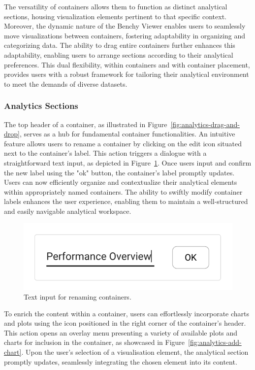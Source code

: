 The versatility of containers allows them to function as distinct analytical sections, housing visualization elements pertinent to that specific context. Moreover, the dynamic nature of the Benchy Viewer enables users to seamlessly move visualizations between containers, fostering adaptability in organizing and categorizing data. The ability to drag entire containers further enhances this adaptability, enabling users to arrange sections according to their analytical preferences. This dual flexibility, within containers and with container placement, provides users with a robust framework for tailoring their analytical environment to meet the demands of diverse datasets.

\subsubsection{Analytics Sections}

The top header of a container, as illustrated in Figure~\ref{fig:analytics-drag-and-drop}, serves as a hub for fundamental container functionalities. An intuitive feature allows users to rename a container by clicking on the edit icon situated next to the container's label. This action triggers a dialogue with a straightforward text input, as depicted in Figure~\ref{fig:analytics-section-rename}. Once users input and confirm the new label using the "ok" button, the container's label promptly updates.\\
Users can now efficiently organize and contextualize their analytical elements within appropriately named containers. The ability to swiftly modify container labels enhances the user experience, enabling them to maintain a well-structured and easily navigable analytical workspace.

\begin{figure}[h]
  \centering
  \includegraphics[width=0.25\linewidth]{figures/analytics-section-rename.png}
  \caption{Text input for renaming containers.}
  \label{fig:analytics-section-rename}
\end{figure}

To enrich the content within a container, users can effortlessly incorporate charts and plots using the icon positioned in the right corner of the container's header. This action opens an overlay menu presenting a variety of available plots and charts for inclusion in the container, as showcased in Figure~\ref{fig:analytics-add-chart}. Upon the user's selection of a visualisation element, the analytical section promptly updates, seamlessly integrating the chosen element into its content.

